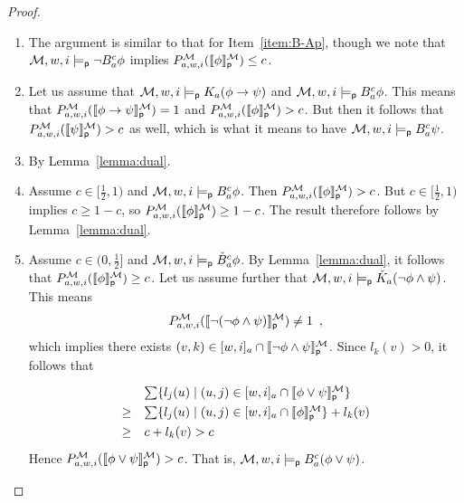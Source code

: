 \documentclass[12pt]{article}
\theoremstyle{definition}
\newcommand{\M}{{\cal M}}      %
\newcommand{\modelsp}{\models_{\mathsf{p}}}                  %
\newcommand{\semp}[1]{\llbracket{#1}\rrbracket_{\mathsf{p}}} %
\begin{document}
\begin{proof}
\begin{enumerate}
  \item The argument is similar to that for Item~\ref{item:B-Ap},
    though we note that $\M,w,i\modelsp\lnot B_a^c\phi$ implies
    $P^\M_{a,w,i}(\semp{\phi}^\M)\leq c$.
    
  \item Let us assume that $\M,w,i\modelsp K_a(\phi\to\psi)$ and
    $\M,w,i\modelsp B_a^c\phi$.  This means that
    $P^\M_{a,w,i}(\semp{\phi\to\psi}^\M)=1$ and
    $P^\M_{a,w,i}(\semp{\phi}^\M)>c$.  But then it follows that
    $P^\M_{a,w,i}(\semp{\psi}^\M)>c$ as well, which is what it means to
    have $\M,w,i\modelsp B_a^c\psi$.

  \item By Lemma~\ref{lemma:dual}.

  \item Assume $c\in[\frac 12,1)$ and $\M,w,i\modelsp B_a^c\phi$.
    Then $P^\M_{a,w,i}(\semp{\phi}^\M)>c$.  But $c\in[\frac 12,1)$
    implies $c\geq 1-c$, so $P^\M_{a,w,i}(\semp{\phi}^\M)\geq 1-c$.
    The result therefore follows by Lemma~\ref{lemma:dual}.

  \item Assume $c\in(0,\frac 12]$ and $\M,w,i\modelsp\check B^c_a\phi$.  By
    Lemma~\ref{lemma:dual}, it follows that
    $P^\M_{a,w,i}(\semp{\phi}^\M)\geq c$.  Let us assume further that
    $\M,w,i\modelsp\check K_a(\lnot\phi\land\psi)$.  This means
    \[
    P^\M_{a,w,i}(\semp{\lnot(\lnot\phi\land\psi)}^\M)\neq 1\enspace,
    \]
    which implies there exists $(v,k)\in[w,i]_a\cap
    \semp{\lnot\phi\land\psi}^\M$.  Since $l_k(v)>0$, it follows that
    \[
    \renewcommand{\arraystretch}{1.3}
    \begin{array}{cl}
      &
      \textstyle \sum\{l_j(u) \mid (u,j)\in[w,i]_a\cap
      \semp{\phi\lor\psi}^\M\}
      \\
      \geq &
      \textstyle \sum\{l_j(u) \mid (u,j)\in[w,i]_a\cap
      \semp{\phi}^\M\} + l_k(v)
      \\
      \geq &
      c+l_k(v) > c
    \end{array}
    \]
    Hence $P^\M_{a,w,i}(\semp{\phi\lor\psi}^\M)>c$.  That is,
    $\M,w,i\modelsp B_a^c(\phi\lor\psi)$.
    

\end{enumerate}
\end{proof}
\end{document}
